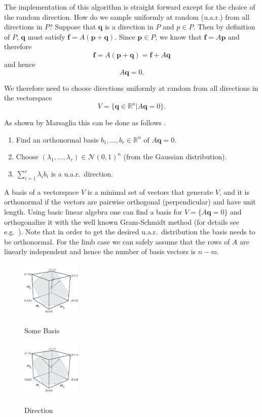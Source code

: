 The implementation of this algorithm is straight forward except for the choice of the random direction. How do we sample uniformly at random (u.a.r.) from all directions in $P$? Suppose that $\textbf{q}$ is a direction in $P$ and $p \in P$. Then by definition of $P$, $\textbf{q}$ must satisfy $\textbf{f} = A(\textbf{p}+\textbf{q})$. Since $\textbf{p} \in P$, we know that $\textbf{f} = A\textbf{p}$ and therefore 
\[\textbf{f} = A(\textbf{p} + \textbf{q}) = \textbf{f} + A\textbf{q}\]
and hence
\[A\textbf{q} = 0.\]

We therefore need to choose directions uniformly at random from all directions in the vectorspace 
\[V = \{\textbf{q} \in \mathbb{R}^n | A\textbf{q} = 0\}.\]

As shown by Marsaglia this can be done as follows \cite{Marsaglia}.

\begin{enumerate}
\item
Find an orthonormal basis $b_1, \dots, b_r \in \mathbb{R}^{n}$ of $A\textbf{q} =0$.
\item
Choose $(\lambda_1, \dots, \lambda_r) \in \mathcal{N}(0,1)^n$ (from the Gaussian distribution).
\item
$\sum_{i=1}^r \lambda_i b_i$ is a u.a.r.\ direction.
\end{enumerate}

A basis of a vectorspace $V$ is a minimal set of vectors that generate $V$, and it is orthonormal if the vectors are pairwise orthogonal (perpendicular) and have unit length. Using basic linear algebra one can find a basis for $V = \{A\textbf{q} = 0\}$ and orthogonalize it with the well known Gram-Schmidt method (for details see e.g.\ \cite{Robertson}). Note that in order to get the desired u.a.r.\ distribution the basis needs to be orthonormal. For the limb case we can safely assume that the rows of $A$ are linearly independent and hence the number of basis vectors is $n-m$.


\begin{figure}[ht]
   \begin{center}
    \includegraphics[width=0.25\textwidth]{somebasis.png}
      \caption{Some Basis}
      \label{fig_somebasis}
    \includegraphics[width=0.25\textwidth]{orthobasis.png}
    \caption{Direction}
      \label{Orthonormal Basis}
  \end{center}
\end{figure}

